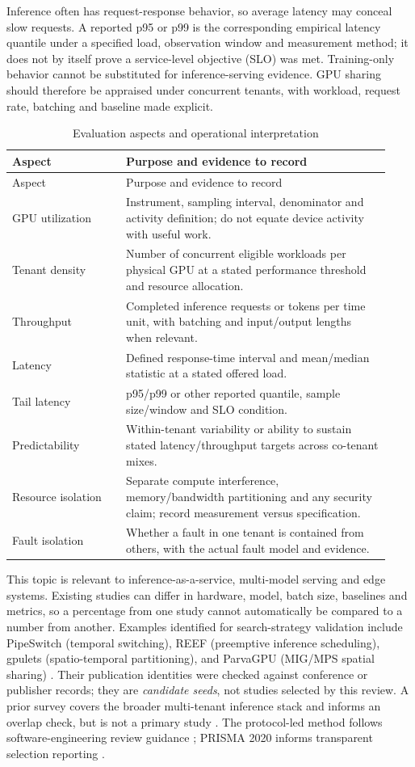 \documentclass[12pt,a4paper]{article}
\begin{document}
Inference often has request-response behavior, so average latency may conceal slow requests. A reported p95 or p99 is the corresponding empirical latency quantile under a specified load, observation window and measurement method; it does not by itself prove a service-level objective (SLO) was met. Training-only behavior cannot be substituted for inference-serving evidence. GPU sharing should therefore be appraised under concurrent tenants, with workload, request rate, batching and baseline made explicit.

\begin{longtable}{p{0.28\linewidth}p{0.65\linewidth}}
\caption{Evaluation aspects and operational interpretation}\label{tab:metrics}\\\toprule Aspect & Purpose and evidence to record\\\midrule\endfirsthead
\toprule Aspect & Purpose and evidence to record\\\midrule\endhead
GPU utilization & Instrument, sampling interval, denominator and activity definition; do not equate device activity with useful work.\\
Tenant density & Number of concurrent eligible workloads per physical GPU at a stated performance threshold and resource allocation.\\
Throughput & Completed inference requests or tokens per time unit, with batching and input/output lengths when relevant.\\
Latency & Defined response-time interval and mean/median statistic at a stated offered load.\\
Tail latency & p95/p99 or other reported quantile, sample size/window and SLO condition.\\
Predictability & Within-tenant variability or ability to sustain stated latency/throughput targets across co-tenant mixes.\\
Resource isolation & Separate compute interference, memory/bandwidth partitioning and any security claim; record measurement versus specification.\\
Fault isolation & Whether a fault in one tenant is contained from others, with the actual fault model and evidence.\\\bottomrule
\end{longtable}

This topic is relevant to inference-as-a-service, multi-model serving and edge systems. Existing studies can differ in hardware, model, batch size, baselines and metrics, so a percentage from one study cannot automatically be compared to a number from another. Examples identified for search-strategy validation include PipeSwitch (temporal switching), REEF (preemptive inference scheduling), gpulets (spatio-temporal partitioning), and ParvaGPU (MIG/MPS spatial sharing) \cite{pipeswitch,reef,gpulets,parvagpu}. Their publication identities were checked against conference or publisher records; they are \emph{candidate seeds}, not studies selected by this review. A prior survey covers the broader multi-tenant inference stack and informs an overlap check, but is not a primary study \cite{yusurvey}. The protocol-led method follows software-engineering review guidance \cite{kitchenham}; PRISMA 2020 informs transparent selection reporting \cite{prisma}.
\end{document}

